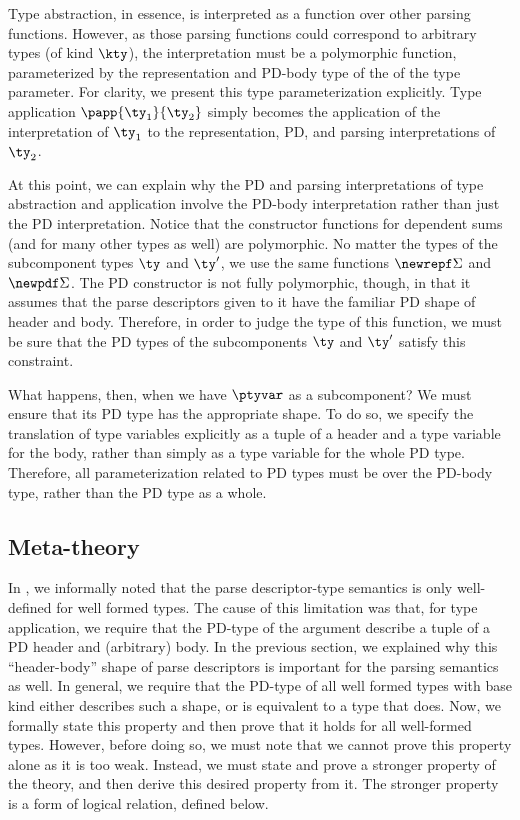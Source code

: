 Type abstraction, in essence, is interpreted as a function
over other parsing functions. However, as those parsing functions
could correspond to arbitrary \ddc{} types (of kind $\kty$), the
interpretation must be a polymorphic function, parameterized by the
representation and PD-body type of the of the \ddc{} type parameter.
For clarity, we present this type parameterization explicitly.  Type
application $\papp {\ty_1}{\ty_2}$ simply becomes the application of
the interpretation of $\ty_1$ to the representation, PD, and parsing
interpretations of $\ty_2$.

At this point, we can explain why the PD and parsing interpretations
of type abstraction and application involve the PD-body interpretation
rather than just the PD interpretation. Notice that the constructor
functions for dependent sums (and for many other types as well) are
polymorphic. No matter the types of the subcomponent types $\ty$ and
$\ty'$, we use the same functions $\newrepf \Sigma$ and $\newpdf
\Sigma$. The PD constructor is not fully polymorphic, though, in that
it assumes that the parse descriptors given to it have the familiar PD
shape of header and body.  Therefore, in order to judge the type of
this function, we must be sure that the PD types of the subcomponents
$\ty$ and $\ty'$ satisfy this constraint.

What happens, then, when we have $\ptyvar$ as a subcomponent? We must
ensure that its PD type has the appropriate shape. To do so, we
specify the translation of type variables explicitly as a tuple of
a header and a type variable for the body, rather than simply as a
type variable for the whole PD type. Therefore, all parameterization
related to PD types must be over the PD-body type, rather than the PD
type as a whole.

\subsection{Meta-theory}
\label{sec:meta-theory}

In , we informally noted that the parse
descriptor-type semantics is only well-defined for well formed types.
The cause of this limitation was that, for type application, we
require that the PD-type of the argument describe a tuple of a PD
header and (arbitrary) body. In the previous section, we explained why
this ``header-body'' shape of parse descriptors is important for the
parsing semantics as well. In general, we require that the PD-type of
all well formed types with base kind either describes such a shape, or
is equivalent to a type that does.  Now, we formally state this
property and then prove that it holds for all well-formed types.
However, before doing so, we must note that we cannot prove this
property alone as it is too weak. Instead, we must state and prove a
stronger property of the theory, and then derive this desired property
from it.  The stronger property is a form of logical relation, defined
below.

